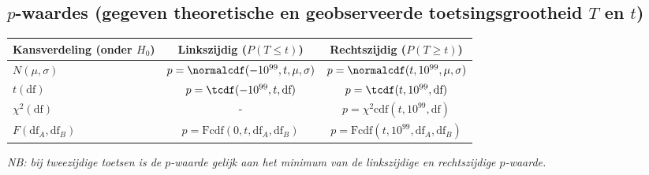 \subsection*{$p$-waardes (gegeven theoretische en geobserveerde toetsingsgrootheid $T$ en $t$)}
    \begin{table}[H]
        \centering
        \renewcommand{\arraystretch}{1.5}
        \begin{tabular}{m{4.5cm}|cc}
            \toprule
                \textbf{Kansverdeling (onder $H_0$)} & \textbf{Linkszijdig ($P(T \le t)$)} & \textbf{Rechtszijdig ($P(T \ge t)$)} \\
            \midrule
                $N(\mu, \sigma)$ & $p = \normalcdf(-10^{99}, t, \mu, \sigma)$ & $p = \normalcdf(t, 10^{99}, \mu, \sigma)$ \\
            \midrule
                $t(\text{df})$ & $p = \tcdf(-10^{99}, t, \text{df})$ & $p = \tcdf(t, 10^{99}, \text{df})$\\
            \midrule
                $\chi^2(\text{df})$ & - & $p = \chi^2\text{cdf}(t, 10^{99}, \text{df})$ \\
            \midrule
                $F(\text{df}_A, \text{df}_B)$ & $p = \text{Fcdf}(0, t, \text{df}_A, \text{df}_B)$ & $p = \text{Fcdf}(t, 10^{99}, \text{df}_A, \text{df}_B)$ \\
            \bottomrule
        \end{tabular}
    \end{table}

    {\itshape NB: bij tweezijdige toetsen is de $p$-waarde gelijk aan het minimum van de linkszijdige en rechtszijdige $p$-waarde.}
\vspace{0.5cm}
